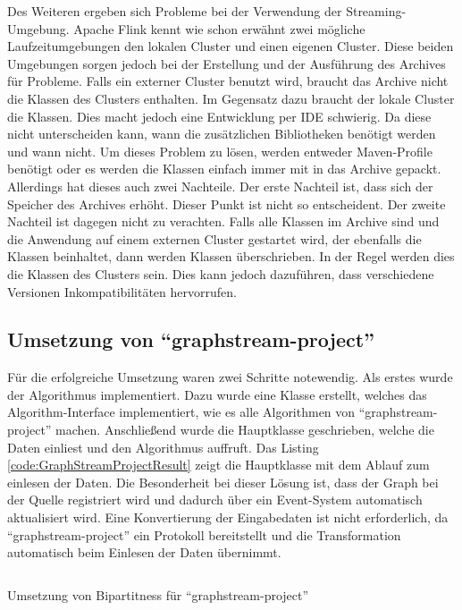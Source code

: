 Des Weiteren ergeben sich Probleme bei der Verwendung der Streaming-Umgebung.
Apache Flink kennt wie schon erwähnt zwei mögliche Laufzeitumgebungen den lokalen
Cluster und einen eigenen Cluster. Diese beiden Umgebungen sorgen jedoch bei
der Erstellung und der Ausführung des Archives für Probleme. Falls ein externer
Cluster benutzt wird, braucht das Archive nicht die Klassen des Clusters
enthalten. Im Gegensatz dazu braucht der lokale Cluster die Klassen. Dies macht
jedoch eine Entwicklung per \gls{IDE} schwierig. Da diese nicht unterscheiden
kann, wann die zusätzlichen Bibliotheken benötigt werden und wann nicht. Um
dieses Problem zu lösen, werden entweder Maven-Profile benötigt oder es werden
die Klassen einfach immer mit in das Archive gepackt. Allerdings hat dieses auch
zwei Nachteile. Der erste Nachteil ist, dass sich der Speicher des Archives
erhöht. Dieser Punkt ist nicht so entscheident. Der zweite Nachteil ist dagegen
nicht zu verachten. Falls alle Klassen im Archive sind und die Anwendung auf
einem externen Cluster gestartet wird, der ebenfalls die Klassen beinhaltet,
dann werden Klassen überschrieben. In der Regel werden dies die Klassen des
Clusters sein. Dies kann jedoch dazuführen, dass verschiedene Versionen
Inkompatibilitäten hervorrufen.

\subsection{Umsetzung von \enquote{graphstream-project}}
Für die erfolgreiche Umsetzung waren zwei Schritte notewendig. Als erstes wurde
der Algorithmus implementiert. Dazu wurde eine Klasse erstellt, welches das
Algorithm-Interface implementiert, wie es alle Algorithmen von
\enquote{graphstream-project} machen. Anschließend wurde die Hauptklasse
geschrieben, welche die Daten einliest und den Algorithmus auffruft.
Das Listing \ref{code:GraphStreamProjectResult} zeigt die Hauptklasse mit dem
Ablauf zum einlesen der Daten. Die Besonderheit bei dieser Lösung ist, dass
der Graph bei der Quelle registriert wird und dadurch über ein Event-System
automatisch aktualisiert wird. Eine Konvertierung der Eingabedaten ist nicht
erforderlich, da \enquote{graphstream-project} ein Protokoll bereitstellt und
die Transformation automatisch beim Einlesen der Daten übernimmt.

\begin{listing}
\inputminted[breaklines=true]{java}{../material/code/GraphStreamProjectResult.java}
\caption{Umsetzung von Bipartitness für \enquote{graphstream-project}}
\label{code:GraphStreamProjectResult}
\end{listing}

